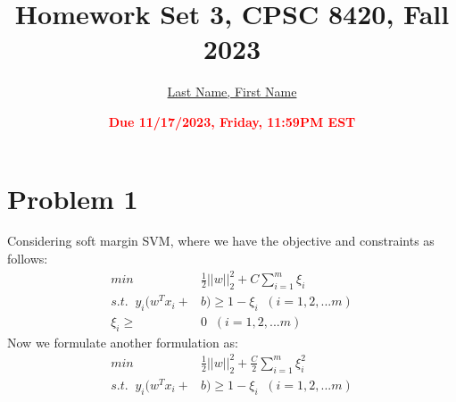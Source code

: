 \documentclass[11pt]{article}
\title{{\bf Homework Set 3, CPSC 8420, Fall 2023}} %
\author{\Large\underline{Last Name, First Name}}
\date{\textbf{\Large\textcolor{red}{Due 11/17/2023, Friday, 11:59PM EST}}} %
\begin{document}
\maketitle

\section*{Problem 1}
Considering soft margin SVM, where we have the objective and constraints as follows:
\begin{equation}\label{eq:1}
	\begin{aligned}
		min\;\; &\frac{1}{2}||w||_2^2 +C\sum\limits_{i=1}^{m}\xi_i\\s.t.  \;\; y_i(w^Tx_i + &b)  \geq 1 - \xi_i \;\;(i =1,2,...m)\\\xi_i \geq &0 \;\;(i =1,2,...m)
	\end{aligned}
\end{equation}
Now we formulate another formulation as:
\begin{equation}
	\begin{aligned}
		min\;\; &\frac{1}{2}||w||_2^2 +\frac{C}{2}\sum\limits_{i=1}^{m}\xi_i^2\\s.t.  \;\; y_i(w^Tx_i + &b)  \geq 1 - \xi_i \;\;(i =1,2,...m)
	\end{aligned}
\end{equation}
\end{document}
